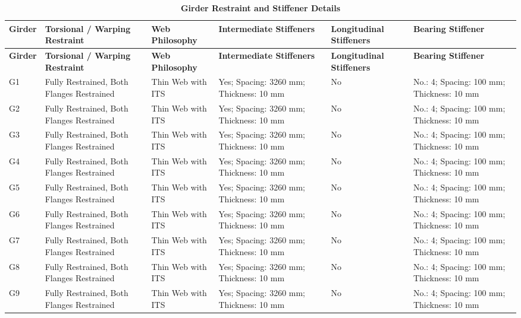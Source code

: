 \documentclass[12pt,a4paper]{report}
\numberwithin{table}{chapter}
\numberwithin{figure}{chapter}
\begin{document}
\vspace{0.6em}

\vspace{4pt}
\begin{longtable}{|L{1.4cm}|p{2.2cm}|p{2.2cm}|p{3.0cm}|p{2.4cm}|p{2.2cm}|}
\caption{\textbf{Girder Restraint and Stiffener Details}}\\
\hline
\textbf{Girder} & \textbf{Torsional / Warping Restraint} & \textbf{Web Philosophy} & \textbf{Intermediate Stiffeners} & \textbf{Longitudinal Stiffeners} & \textbf{Bearing Stiffener} \\[6pt]
\hline
\endfirsthead
\hline
\textbf{Girder} & \textbf{Torsional / Warping Restraint} & \textbf{Web Philosophy} & \textbf{Intermediate Stiffeners} & \textbf{Longitudinal Stiffeners} & \textbf{Bearing Stiffener} \\[6pt]
\hline
\endhead
G1 & Fully Restrained, Both Flanges Restrained & Thin Web with ITS & Yes; Spacing: 3260 mm; Thickness: 10 mm & No & No.: 4; Spacing: 100 mm; Thickness: 10 mm \\[8pt]
\hline
G2 & Fully Restrained, Both Flanges Restrained & Thin Web with ITS & Yes; Spacing: 3260 mm; Thickness: 10 mm & No & No.: 4; Spacing: 100 mm; Thickness: 10 mm \\[8pt]
\hline
G3 & Fully Restrained, Both Flanges Restrained & Thin Web with ITS & Yes; Spacing: 3260 mm; Thickness: 10 mm & No & No.: 4; Spacing: 100 mm; Thickness: 10 mm \\[8pt]
\hline
G4 & Fully Restrained, Both Flanges Restrained & Thin Web with ITS & Yes; Spacing: 3260 mm; Thickness: 10 mm & No & No.: 4; Spacing: 100 mm; Thickness: 10 mm \\[8pt]
\hline
G5 & Fully Restrained, Both Flanges Restrained & Thin Web with ITS & Yes; Spacing: 3260 mm; Thickness: 10 mm & No & No.: 4; Spacing: 100 mm; Thickness: 10 mm \\[8pt]
\hline
G6 & Fully Restrained, Both Flanges Restrained & Thin Web with ITS & Yes; Spacing: 3260 mm; Thickness: 10 mm & No & No.: 4; Spacing: 100 mm; Thickness: 10 mm \\[8pt]
\hline
G7 & Fully Restrained, Both Flanges Restrained & Thin Web with ITS & Yes; Spacing: 3260 mm; Thickness: 10 mm & No & No.: 4; Spacing: 100 mm; Thickness: 10 mm \\[8pt]
\hline
G8 & Fully Restrained, Both Flanges Restrained & Thin Web with ITS & Yes; Spacing: 3260 mm; Thickness: 10 mm & No & No.: 4; Spacing: 100 mm; Thickness: 10 mm \\[8pt]
\hline
G9 & Fully Restrained, Both Flanges Restrained & Thin Web with ITS & Yes; Spacing: 3260 mm; Thickness: 10 mm & No & No.: 4; Spacing: 100 mm; Thickness: 10 mm \\[8pt]
\hline
\end{longtable}
\end{document}
